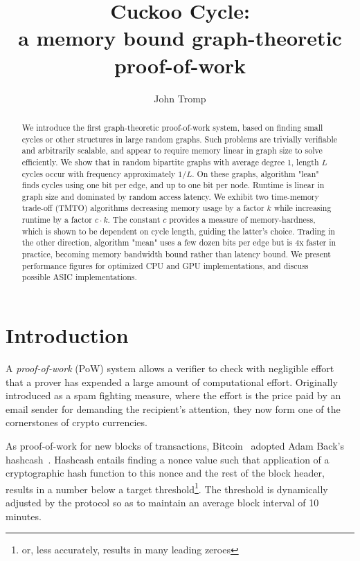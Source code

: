 \documentclass[11pt, oneside]{article}
\title{Cuckoo Cycle: \protect\\ a memory bound graph-theoretic proof-of-work}
\author{John Tromp}
\begin{document}
\maketitle

\begin{abstract}
We introduce the first graph-theoretic proof-of-work system,
based on finding small cycles or other structures in large random graphs.
Such problems are trivially verifiable and arbitrarily scalable, 
and appear to require memory linear in graph size to solve efficiently.
We show that in random bipartite graphs with average degree 1,
length $L$ cycles occur with frequency approximately $1/L$.
On these graphs, algorithm "lean" finds cycles using one bit per edge, and up to one bit per node.
Runtime is linear in graph size and dominated by random access latency.
We exhibit two time-memory trade-off (TMTO) algorithms
decreasing memory usage by a factor $k$ while increasing runtime by a factor $c \cdot k$.
The constant $c$ provides a measure of memory-hardness, which is shown to be dependent
on cycle length, guiding the latter's choice.
Trading in the other direction, algorithm "mean" uses a few dozen bits per edge but is 4x faster
in practice, becoming memory bandwidth bound rather than latency bound.
We present performance figures for optimized CPU and GPU implementations,
and discuss possible ASIC implementations.
\end{abstract}

\section{Introduction}
A {\em proof-of-work} (PoW) system allows a verifier to check with negligible
effort that a prover has expended a large amount of computational effort.
Originally introduced as a spam fighting measure, 
where the effort is the price paid by an email sender for demanding the
recipient's attention, they now form one of the cornerstones of crypto currencies.

As proof-of-work for new blocks of transactions,
Bitcoin~\cite{nakamoto2009bitcoin} adopted Adam Back's hashcash~\cite{back2002}.
Hashcash entails finding a nonce value such that application of a cryptographic hash function
to this nonce and the rest of the block header, results in a number below a
target threshold\footnote{or, less accurately, results in many leading zeroes}.
The threshold is dynamically adjusted by the protocol
so as to maintain an average block interval of 10 minutes.
\end{document}
